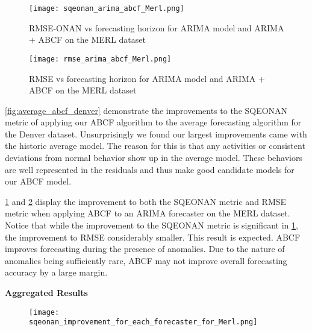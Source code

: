 \begin{figure}[!b]
	\begin{center}
		\texttt{[image: sqeonan\_arima\_abcf\_Merl.png]}
	\end{center}
	\caption{RMSE-ONAN vs forecasting horizon for ARIMA model and ARIMA + ABCF on the MERL dataset}
	\label{fig:arima_merl_sqe}
\end{figure}


\begin{figure}[!h]
	\begin{center}
		\texttt{[image: rmse\_arima\_abcf\_Merl.png]}
	\end{center}
	\caption{RMSE vs forecasting horizon for ARIMA model and ARIMA + ABCF on the MERL dataset}
	\label{fig:arima_merl_rmse}
\end{figure}

\ref{fig:average_abcf_denver} demonstrate the improvements to the SQEONAN metric of applying our ABCF algorithm to the average forecasting algorithm for the Denver dataset.  Unsurprisingly we found our largest improvements came with the historic average model.  The reason for this is that any activities or consistent deviations from normal behavior show up in the average model.  These behaviors are well represented in the residuals and thus make good candidate models for our ABCF model.

\ref{fig:arima_merl_sqe} and \ref{fig:arima_merl_rmse} display the improvement to both the SQEONAN metric and RMSE metric when applying ABCF to an ARIMA forecaster on the MERL dataset.  Notice that while the improvement to the SQEONAN metric is significant in \ref{fig:arima_merl_sqe}, the improvement to RMSE considerably smaller.  This result is expected.  ABCF improves forecasting during the presence of anomalies.  Due to the nature of anomalies being sufficiently rare, ABCF may not improve overall forecasting accuracy by a large margin.

\newpage


\bigskip
\noindent \textbf{Aggregated Results} 

\begin{figure}[!h]
	\begin{center}
		\texttt{[image: sqeonan\_improvement\_for\_each\_forecaster\_for\_Merl.png]}
	\end{center}
	\caption{}
	\label{fig:sqe_improve_merl}
\end{figure}

